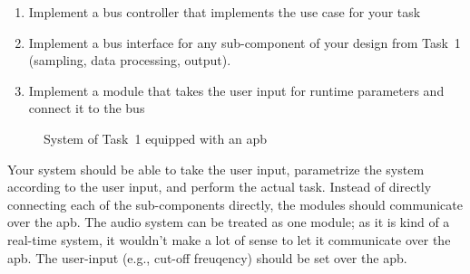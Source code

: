 \documentclass[%
	a4paper,
]
{article}
\begin{document}
\begin{enumerate}

	\item{Implement a bus controller that implements the use case for your
		task}

	\item{Implement a bus interface for any sub-component of your design
		from Task~1 (sampling, data processing, output).}

	\item{Implement a module that takes the user input for runtime parameters
		and connect it to the bus}

\end{enumerate}

\begin{figure}[h!]
	\centering
	
	\caption{System of Task~1 equipped with an \gls{apb}}
	\label{fig:audio-block}
\end{figure}

Your system should be able to take the user input, parametrize the system
according to the user input, and perform the actual task. Instead of
directly connecting each of the sub-components directly, the modules should
communicate over the \gls{apb}. The audio system can be treated as one
module; as it is kind of a real-time system, it wouldn't make a lot of sense
to let it communicate over the \gls{apb}. The user-input (e.g., cut-off
freuqency) should be set over the \gls{apb}.
%
%

\end{document}
